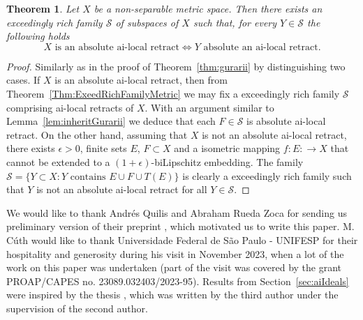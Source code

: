 \documentclass[11pt]{amsart}
\newtheorem{thm}{Theorem}
\theoremstyle{definition}
\theoremstyle{remark}
\newcommand{\SSS}{\mathcal S}
\begin{document}
\begin{thm}\label{thm:urysohn}
Let $X$ be a non-separable metric space. Then there exists an exceedingly rich family $\SSS$ of subspaces of $X$ such that, for every $Y\in \SSS$ the following holds
\[
X \text{ is an absolute ai-local retract} \Leftrightarrow Y\text{ absolute an ai-local retract}.
\]
\end{thm}
\begin{proof}
Similarly as in the proof of Theorem~\ref{thm:gurarii} by distinguishing two cases. If $X$ is an absolute ai-local retract, then from Theorem~\ref{Thm:ExeedRichFamilyMetric} we may fix a exceedingly rich family $\SSS$ comprising ai-local retracts of $X$. With an argument similar to Lemma~\ref{lem:inheritGurarii} we deduce that each $F\in \SSS$ is absolute ai-local retract.
On the other hand, assuming that $X$ is not an absolute ai-local retract, there exists $\epsilon>0$, finite sets $E$, $F\subset X$ and a isometric mapping $f:E:\to X$ that cannot be extended to a $(1+\epsilon)$-biLipschitz embedding. The family $\SSS=\{Y\subset X:Y\text{ contains }E\cup F\cup T(E)\}$ is clearly a exceedingly rich family 
such that $Y$ is not an absolute ai-local retract for all $Y\in \SSS$.
\end{proof}

We would like to thank Andr\'es Quilis and Abraham Rueda Zoca for sending us preliminary version of their preprint \cite{QuilisZoca}, which motivated us to write this paper. M. C\'uth would like to thank Universidade Federal de S\~{a}o Paulo - UNIFESP for their hospitality and generosity during his visit in November 2023, when a lot of the work on this paper was undertaken (part of the visit was covered by the grant PROAP/CAPES
no. 23089.032403/2023-95). Results from Section~\ref{sec:aiIdeals} were inspired by the thesis \cite{Smetana}, which was written by the third author under the supervision of the second author.
\end{document}
